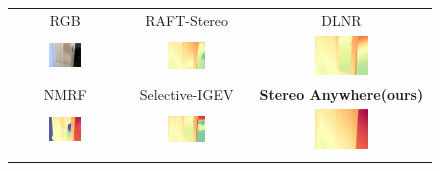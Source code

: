\documentclass[10pt,twocolumn,letterpaper]{article}
\newcommand{\method}[0]{Stereo Anywhere\xspace}
\begin{document}
\begin{figure}[t]
    \centering
    \renewcommand{\tabcolsep}{1pt}
    \begin{tabular}{ccc}
        \small RGB &
        \small RAFT-Stereo \cite{lipson2021raft} &
        \small DLNR \cite{zhao2023high} \\
        \includegraphics[width=0.32\textwidth]{imgs/booster/rgb/14.jpg} &
        \includegraphics[width=0.32\textwidth]{imgs/booster/stereo/RAFT-Stereo/14.jpg} &
        \includegraphics[width=0.32\textwidth]{imgs/booster/stereo/DLNR/14.jpg} \\
        \small NMRF \cite{guan2024neural} &
        \small Selective-IGEV \cite{wang2024selective} &
        \textbf{\method (ours)} \\
        \includegraphics[width=0.32\textwidth]{imgs/booster/stereo/NMRF/14.jpg} &
        \includegraphics[width=0.32\textwidth]{imgs/booster/stereo/Selective/14.jpg} &
        \includegraphics[width=0.32\textwidth]{imgs/booster/stereo/Ours/14.jpg} \\ \\


\end{tabular}
\end{figure}
\end{document}
